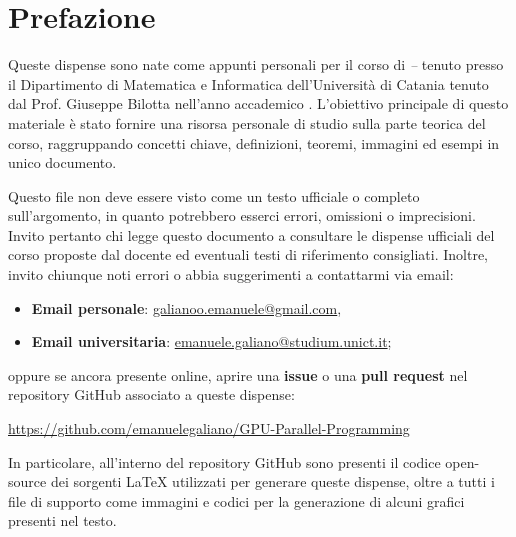 \chapter*{Prefazione}

\setlength{\parskip}{0.8em}
\setlength{\parindent}{0pt}

Queste dispense sono nate come appunti personali per il corso di \emph{\BookTitle -- \BookSubtitle} tenuto presso il Dipartimento di Matematica e Informatica dell'Universit\`a di Catania tenuto dal Prof. Giuseppe Bilotta nell'anno accademico \BookAY. L'obiettivo principale di questo materiale è stato fornire una risorsa personale di studio sulla parte teorica del corso, raggruppando concetti chiave, definizioni, teoremi, immagini ed esempi in unico documento. 

Questo file non deve essere visto come un testo ufficiale o completo sull'argomento, in quanto potrebbero esserci errori, omissioni o imprecisioni. Invito pertanto chi legge questo documento a consultare le dispense ufficiali del corso proposte dal docente ed eventuali testi di riferimento consigliati. Inoltre, invito chiunque noti errori o abbia suggerimenti a contattarmi via email:
\begin{itemize}
    \item \textbf{Email personale}: \href{mailto:galianoo.emanuele@gmail.com}{galianoo.emanuele@gmail.com},
    \item \textbf{Email universitaria}: \href{mailto:emanuele.galiano@studium.unict.it}{emanuele.galiano@studium.unict.it};
\end{itemize}

\noindent
oppure se ancora presente online, aprire una \textbf{issue} o una \textbf{pull request} nel repository GitHub associato a queste dispense: 
\begin{center}
\begin{minipage}{0.92\textwidth}
\centering
\url{https://github.com/emanuelegaliano/GPU-Parallel-Programming}
\end{minipage}
\end{center}

In particolare, all'interno del repository GitHub sono presenti il codice open-source dei sorgenti \LaTeX{} utilizzati per generare queste dispense, oltre a tutti i file di supporto come immagini e codici per la generazione di alcuni grafici presenti nel testo. 